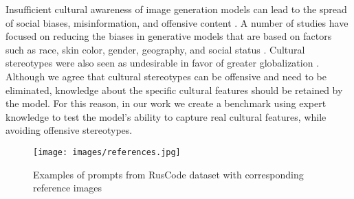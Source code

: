 Insufficient cultural awareness of image generation models can lead to the spread of social biases, misinformation, and offensive content \cite{10.1145/3600211.3604711, Cho2023DallEval, 10.5555/3666122.3668580}. A number of studies have focused on reducing the biases in generative models that are based on factors such as race, skin color, gender, geography, and social status \cite{9656762, 10.1145/3600211.3604711, NEURIPS2023_ae9500c4, 10.1145/3630106.3658968, Clemmer_2024_WACV}. Cultural stereotypes were also seen as undesirable in favor of greater globalization \cite{berg-etal-2022-prompt, 10.1613/jair.1.15388}. Although we agree that cultural stereotypes can be offensive and need to be eliminated, knowledge about the specific cultural features should be retained by the model. For this reason, in our work we create a benchmark using expert knowledge to test the model's ability to capture real cultural features, while avoiding offensive stereotypes.

\begin{figure*}[t]
\centering
\texttt{[image: images/references.jpg]}
\caption{Examples of prompts from RusCode dataset with corresponding reference images}
\label{fig:references}
\end{figure*}